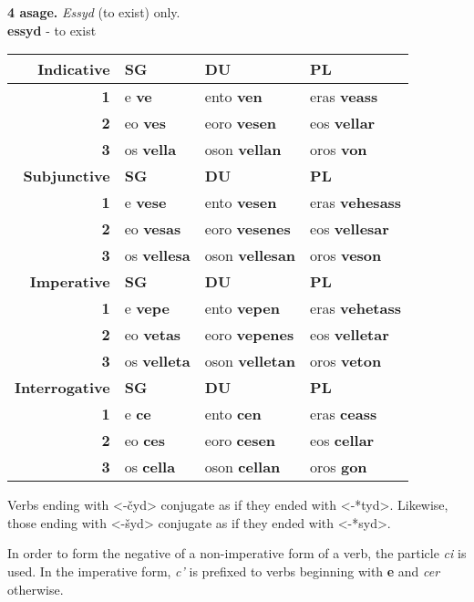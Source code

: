 \documentclass{book}
\begin{document}
\begin{center}
  \textbf{4 asage.} \emph{Essyd} (to exist) only. \\
  \textbf{essyd} - to exist \\
  \begin{tabular}{|r|l|l|l|}
    \hline
    \textbf{Indicative} & \textbf{SG} & \textbf{DU} & \textbf{PL} \\ \hline
    \textbf{1} & e \textbf{ve} & ento \textbf{ven} & eras \textbf{veass} \\ \hline
    \textbf{2} & eo \textbf{ves} & eoro \textbf{vesen} & eos \textbf{vellar} \\ \hline
    \textbf{3} & os \textbf{vella} & oson \textbf{vellan} & oros \textbf{von} \\ \hline
    \textbf{Subjunctive} & \textbf{SG} & \textbf{DU} & \textbf{PL} \\ \hline
    \textbf{1} & e \textbf{vese} & ento \textbf{vesen} & eras \textbf{vehesass} \\ \hline
    \textbf{2} & eo \textbf{vesas} & eoro \textbf{vesenes} & eos \textbf{vellesar} \\ \hline
    \textbf{3} & os \textbf{vellesa} & oson \textbf{vellesan} & oros \textbf{veson} \\ \hline
    \textbf{Imperative} & \textbf{SG} & \textbf{DU} & \textbf{PL} \\ \hline
    \textbf{1} & e \textbf{vepe} & ento \textbf{vepen} & eras \textbf{vehetass} \\ \hline
    \textbf{2} & eo \textbf{vetas} & eoro \textbf{vepenes} & eos \textbf{velletar} \\ \hline
    \textbf{3} & os \textbf{velleta} & oson \textbf{velletan} & oros \textbf{veton} \\ \hline
    \textbf{Interrogative} & \textbf{SG} & \textbf{DU} & \textbf{PL} \\ \hline
    \textbf{1} & e \textbf{ce} & ento \textbf{cen} & eras \textbf{ceass} \\ \hline
    \textbf{2} & eo \textbf{ces} & eoro \textbf{cesen} & eos \textbf{cellar} \\ \hline
    \textbf{3} & os \textbf{cella} & oson \textbf{cellan} & oros \textbf{gon} \\ \hline
  \end{tabular}
\end{center}

Verbs ending with <-čyd> conjugate as if they ended with <-*tyd>. Likewise, those ending with <-šyd> conjugate as if they ended with <-*syd>.

In order to form the negative of a non-imperative form of a verb, the particle \emph{ci} is used. In the imperative form, \emph{c'} is prefixed to verbs beginning with \textbf{e} and \emph{cer} otherwise. \\
\end{document}
